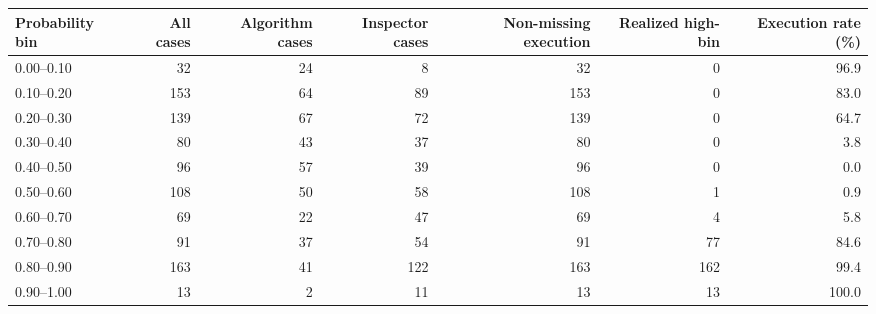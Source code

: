 \begin{tabular}[t]{lrrrrrr}
\toprule
Probability bin & All cases & Algorithm cases & Inspector cases & Non-missing execution & Realized high-bin & Execution rate (\%)\\
\midrule
0.00--0.10 & 32 & 24 & 8 & 32 & 0 & 96.9\\
0.10--0.20 & 153 & 64 & 89 & 153 & 0 & 83.0\\
0.20--0.30 & 139 & 67 & 72 & 139 & 0 & 64.7\\
0.30--0.40 & 80 & 43 & 37 & 80 & 0 & 3.8\\
0.40--0.50 & 96 & 57 & 39 & 96 & 0 & 0.0\\
0.50--0.60 & 108 & 50 & 58 & 108 & 1 & 0.9\\
0.60--0.70 & 69 & 22 & 47 & 69 & 4 & 5.8\\
0.70--0.80 & 91 & 37 & 54 & 91 & 77 & 84.6\\
0.80--0.90 & 163 & 41 & 122 & 163 & 162 & 99.4\\
0.90--1.00 & 13 & 2 & 11 & 13 & 13 & 100.0\\
\bottomrule
\end{tabular}
